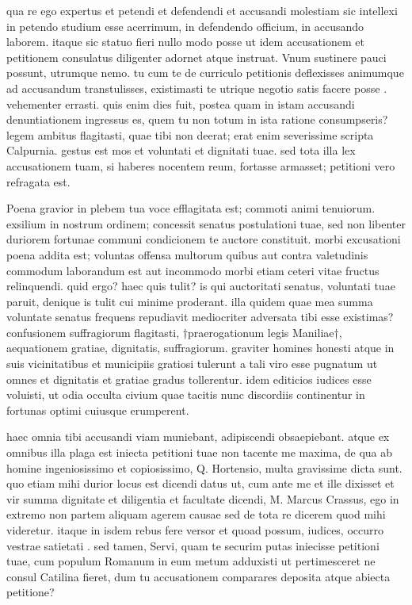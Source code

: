  qua re ego expertus et petendi et defendendi et accusandi molestiam sic intellexi in petendo studium esse acerrimum, in defendendo officium, in accusando laborem. itaque sic statuo fieri nullo modo posse ut idem accusationem et petitionem consulatus diligenter adornet atque instruat. Vnum sustinere pauci possunt, utrumque nemo. tu cum te de curriculo petitionis deflexisses animumque ad accusandum transtulisses, existimasti te utrique negotio satis facere posse . vehementer errasti. quis enim dies fuit, postea quam in istam accusandi denuntiationem ingressus es, quem tu non totum in ista ratione consumpseris? legem ambitus flagitasti, quae tibi non deerat; erat enim severissime scripta Calpurnia. gestus est mos et voluntati et dignitati tuae. sed tota illa lex accusationem tuam, si haberes nocentem reum, fortasse armasset; petitioni vero refragata est.

 Poena gravior in plebem tua voce efflagitata est; commoti animi tenuiorum. exsilium in nostrum ordinem; concessit senatus postulationi tuae, sed non libenter duriorem fortunae communi condicionem te auctore constituit. morbi excusationi poena addita est; voluntas offensa multorum quibus aut contra valetudinis commodum laborandum est aut incommodo morbi etiam ceteri vitae fructus relinquendi. quid ergo? haec quis tulit? is qui auctoritati senatus, voluntati tuae paruit, denique is tulit cui minime proderant. illa quidem quae mea summa voluntate senatus frequens repudiavit mediocriter adversata tibi esse existimas? confusionem suffragiorum flagitasti, †praerogationum legis Maniliae†, aequationem gratiae, dignitatis, suffragiorum. graviter homines honesti atque in suis vicinitatibus et municipiis gratiosi tulerunt a tali viro esse pugnatum ut omnes et dignitatis et gratiae gradus tollerentur. idem editicios iudices esse voluisti, ut odia occulta civium quae tacitis nunc discordiis continentur in fortunas optimi cuiusque erumperent.

 haec omnia tibi accusandi viam muniebant, adipiscendi obsaepiebant. atque ex omnibus illa plaga est iniecta petitioni tuae non tacente me maxima, de qua ab homine ingeniosissimo et copiosissimo, Q. Hortensio, multa gravissime dicta sunt. quo etiam mihi durior locus est dicendi datus ut, cum ante me et ille dixisset et vir summa dignitate et diligentia et facultate dicendi, M. Marcus Crassus, ego in extremo non partem aliquam agerem causae sed de tota re dicerem quod mihi videretur. itaque in isdem rebus fere versor et quoad possum, iudices, occurro vestrae satietati . sed tamen, Servi, quam te securim putas iniecisse petitioni tuae, cum populum Romanum in eum metum adduxisti ut pertimesceret ne consul Catilina fieret, dum tu accusationem comparares deposita atque abiecta petitione?

